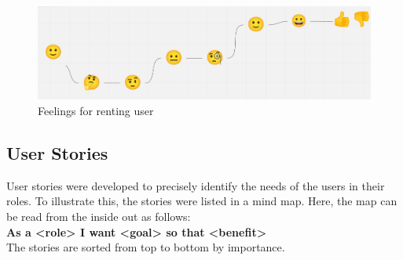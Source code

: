 			\begin{figure}[H]
				\centering
				\includegraphics[width=\linewidth]{abb/2_context_of_use/feelings_lending.png}
				\caption{Feelings for renting user}
				\label{fig:ujm_lending_feelings}
			\end{figure}

\subsection{User Stories}


User stories were developed to precisely identify the needs of the users in their roles. To illustrate this, the stories were listed in a mind map. Here, the map can be read from the inside out as follows:\\
\textbf {As a \colorbox{role}{<role>} I want \colorbox{goal}{<goal>} so that \colorbox{benefit}{<benefit>}}\\
The stories are sorted from top to bottom by importance.

\pagebreak

